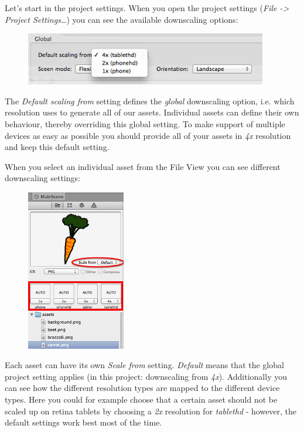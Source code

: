 Let's start in the project settings. When you open the project settings
(\textit{File -> Project Settings\ldots}) you can see the available downscaling options:

\begin{figure}[H]
		\centering
		\includegraphics[width=300pt]{images/Chapter2/DownScalingGlobal.png}
\end{figure}

The \textit{Default scaling from} setting defines the \textit{global}
downscaling option, i.e. which resolution \SB{} uses to generate all of our
assets. Individual assets can define their own behaviour, thereby overriding
this global setting. To make support of multiple devices as easy as possible you should provide all of your assets in \textit{4x} resolution and keep this default setting.

When you select an individual asset from the File View you can see different
downscaling settings:

\begin{figure}[H]
		\centering
		\includegraphics[height=200pt]{images/Chapter2/DownScalingPerAsset.png}
\end{figure}

Each asset can have its own \textit{Scale from} setting. \textit{Default} means
that the global project setting applies (in this project: downscaling from
\textit{4x}). Additionally you can see how the different resolution types are
mapped to the different device types. Here you could for example choose that a
certain asset should not be scaled up on retina tablets by choosing a
\textit{2x} resolution for \textit{tablethd} - however, the default settings
work best most of the time.

